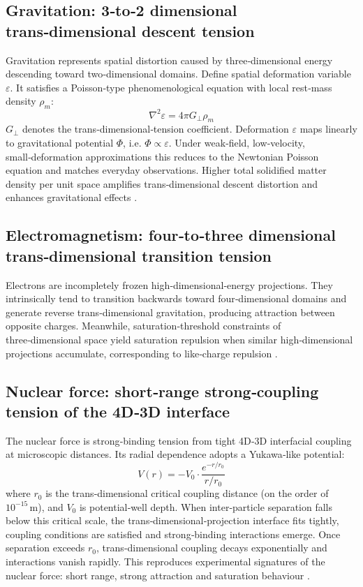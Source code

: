 \documentclass[12pt,a4paper]{article}
\begin{document}
\subsection{Gravitation: 3‑to‑2 dimensional trans‑dimensional descent tension}
Gravitation represents spatial distortion caused by three‑dimensional energy descending toward two‑dimensional domains. Define spatial deformation variable $\varepsilon$. It satisfies a Poisson‑type phenomenological equation with local rest‑mass density $\rho_m$:
\begin{equation}
\nabla^2 \varepsilon = 4\pi G_\perp \rho_m
\end{equation}
$G_\perp$ denotes the trans‑dimensional‑tension coefficient. Deformation $\varepsilon$ maps linearly to gravitational potential $\Phi$, i.e. $\Phi\propto\varepsilon$. Under weak‑field, low‑velocity, small‑deformation approximations this reduces to the Newtonian Poisson equation and matches everyday observations. Higher total solidified matter density per unit space amplifies trans‑dimensional descent distortion and enhances gravitational effects \cite{chandrasekhar1965}.

\subsection{Electromagnetism: four‑to‑three dimensional trans‑dimensional transition tension}
Electrons are incompletely frozen high‑dimensional‑energy projections. They intrinsically tend to transition backwards toward four‑dimensional domains and generate reverse trans‑dimensional gravitation, producing attraction between opposite charges. Meanwhile, saturation‑threshold constraints of three‑dimensional space yield saturation repulsion when similar high‑dimensional projections accumulate, corresponding to like‑charge repulsion \cite{jackson1998}.

\subsection{Nuclear force: short‑range strong‑coupling tension of the 4D‑3D interface}
The nuclear force is strong‑binding tension from tight 4D‑3D interfacial coupling at microscopic distances. Its radial dependence adopts a Yukawa‑like potential:
\begin{equation}
V(r)=-V_0 \cdot \frac{e^{-r/r_0}}{r/r_0}
\end{equation}
where $r_0$ is the trans‑dimensional critical coupling distance (on the order of $10^{-15}\,\text{m}$), and $V_0$ is potential‑well depth. When inter‑particle separation falls below this critical scale, the trans‑dimensional‑projection interface fits tightly, coupling conditions are satisfied and strong‑binding interactions emerge. Once separation exceeds $r_0$, trans‑dimensional coupling decays exponentially and interactions vanish rapidly. This reproduces experimental signatures of the nuclear force: short range, strong attraction and saturation behaviour \cite{yukawa1935,halzen1984}.
\end{document}
